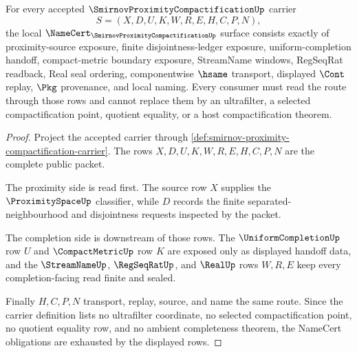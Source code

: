 \begin{theorem}
\label{thm:smirnov-proximity-compactification-namecert-obligations}
For every accepted $\SmirnovProximityCompactificationUp$ carrier
$$
S=(X,D,U,K,W,R,E,H,C,P,N),
$$
the local $\NameCert_{\SmirnovProximityCompactificationUp}$ surface consists exactly of proximity-source exposure, finite disjointness-ledger exposure, uniform-completion handoff, compact-metric boundary exposure, StreamName windows, RegSeqRat readback, Real seal ordering, componentwise $\hsame$ transport, displayed $\Cont$ replay, $\Pkg$ provenance, and local naming. Every consumer must read the route through those rows and cannot replace them by an ultrafilter, a selected compactification point, quotient equality, or a host compactification theorem.
\end{theorem}
\begin{proof}
Project the accepted carrier through \autoref{def:smirnov-proximity-compactification-carrier}. The rows $X,D,U,K,W,R,E,H,C,P,N$ are the complete public packet.

The proximity side is read first. The source row $X$ supplies the $\ProximitySpaceUp$ classifier, while $D$ records the finite separated-neighbourhood and disjointness requests inspected by the packet.

The completion side is downstream of those rows. The $\UniformCompletionUp$ row $U$ and $\CompactMetricUp$ row $K$ are exposed only as displayed handoff data, and the $\StreamNameUp$, $\RegSeqRatUp$, and $\RealUp$ rows $W,R,E$ keep every completion-facing read finite and sealed.

Finally $H,C,P,N$ transport, replay, source, and name the same route. Since the carrier definition lists no ultrafilter coordinate, no selected compactification point, no quotient equality row, and no ambient completeness theorem, the NameCert obligations are exhausted by the displayed rows.
\end{proof}

